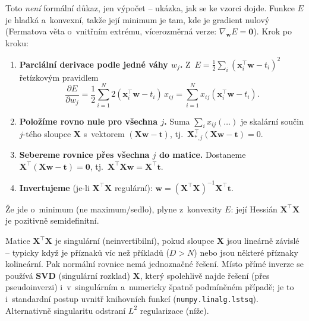 \begin{intuice}
Toto \emph{není} formální důkaz, jen výpočet -- ukázka, jak se ke vzorci dojde. Funkce $E$ je hladká a~konvexní, takže její minimum je tam, kde je gradient nulový (Fermatova věta o~vnitřním extrému, vícerozměrná verze: $\nabla_{\mathbf{w}}E=\mathbf{0}$). Krok po kroku:
\begin{enumerate}
  \item \textbf{Parciální derivace podle jedné váhy $w_j$.} Z~$E=\tfrac12\sum_i(\mathbf{x}_i^{\!\top}\mathbf{w}-t_i)^2$ řetízkovým pravidlem
  \[ \frac{\partial E}{\partial w_j}=\frac12\sum_{i=1}^N 2(\mathbf{x}_i^{\!\top}\mathbf{w}-t_i)\,x_{ij}=\sum_{i=1}^N x_{ij}(\mathbf{x}_i^{\!\top}\mathbf{w}-t_i). \]
  \item \textbf{Položíme rovno nule pro všechna $j$.} Suma $\sum_i x_{ij}(\dots)$ je skalární součin $j$-tého sloupce $\mathbf{X}$ s~vektorem $(\mathbf{X}\mathbf{w}-\mathbf{t})$, tj.\ $\mathbf{X}_{*,j}^{\!\top}(\mathbf{X}\mathbf{w}-\mathbf{t})=0$.
  \item \textbf{Sebereme rovnice přes všechna $j$ do matice.} Dostaneme $\mathbf{X}^{\!\top}(\mathbf{X}\mathbf{w}-\mathbf{t})=\mathbf{0}$, tj.\ $\mathbf{X}^{\!\top}\mathbf{X}\mathbf{w}=\mathbf{X}^{\!\top}\mathbf{t}$.
  \item \textbf{Invertujeme} (je-li $\mathbf{X}^{\!\top}\mathbf{X}$ regulární): $\mathbf{w}=(\mathbf{X}^{\!\top}\mathbf{X})^{-1}\mathbf{X}^{\!\top}\mathbf{t}$.
\end{enumerate}
Že jde o~minimum (ne maximum/sedlo), plyne z~konvexity $E$: její Hessián $\mathbf{X}^{\!\top}\mathbf{X}$ je pozitivně semidefinitní.
\end{intuice}

\begin{poznamka}
Matice $\mathbf{X}^{\!\top}\mathbf{X}$ je singulární (neinvertibilní), pokud sloupce $\mathbf{X}$ jsou lineárně závislé -- typicky když je příznaků víc než příkladů ($D>N$) nebo jsou některé příznaky kolineární. Pak normální rovnice nemá jednoznačné řešení. Místo přímé inverze se používá \textbf{SVD} (singulární rozklad) $\mathbf{X}$, který spolehlivě najde řešení (přes pseudoinverzi) i~v~singulárním a~numericky špatně podmíněném případě; je to i~standardní postup uvnitř knihovních funkcí (\texttt{numpy.linalg.lstsq}). Alternativně singularitu odstraní $L^2$ regularizace (níže).
\end{poznamka}

